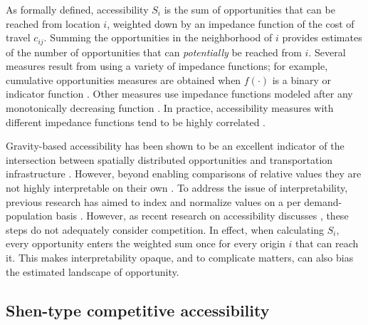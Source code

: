 \documentclass[]{elsarticle} %
\begin{document}
As formally defined, accessibility \(S_i\) is the sum of opportunities
that can be reached from location \(i\), weighted down by an impedance
function of the cost of travel \(c_{ij}\). Summing the opportunities in
the neighborhood of \(i\) provides estimates of the number of
opportunities that can \emph{potentially} be reached from \(i\). Several
measures result from using a variety of impedance functions; for
example, cumulative opportunities measures are obtained when
\(f(\cdot)\) is a binary or indicator function
\citep[e.g.,][]{elgeneidy_cost_2016, rosik_forecast_2021, geurs2004, qi_decadelong_2018}.
Other measures use impedance functions modeled after any monotonically
decreasing function \citep[e.g., Gaussian, inverse power, negative
exponential, or log-normal, among others, see, \emph{inter
alia},][]{kwan_spacetime_1998, vale_influence_2017, reggiani_accessibility_2011, li_approach_2020}.
In practice, accessibility measures with different impedance functions
tend to be highly correlated
\citep{higgins2019, santanapalacios2022, kwan_spacetime_1998}.

Gravity-based accessibility has been shown to be an excellent indicator
of the intersection between spatially distributed opportunities and
transportation infrastructure
\citep{shi_literature_2020, reggiani_accessibility_2011, kwan_spacetime_1998}.
However, beyond enabling comparisons of relative values they are not
highly interpretable on their own \citep{miller2018}. To address the
issue of interpretability, previous research has aimed to index and
normalize values on a per demand-population basis
\citep[e.g.,][]{barboza_balancing_2021, pereira_distributional_2019, wang_access_2021}.
However, as recent research on accessibility discusses
\citep[e.g.,][]{merlin2017competition, allen2019, paez2019, kelobonye2020measuring},
these steps do not adequately consider competition. In effect, when
calculating \(S_i\), every opportunity enters the weighted sum once for
every origin \(i\) that can reach it. This makes interpretability
opaque, and to complicate matters, can also bias the estimated landscape
of opportunity.

\hypertarget{shen-type-competitive-accessibility}{%
\subsection{Shen-type competitive
accessibility}\label{shen-type-competitive-accessibility}}
\end{document}
